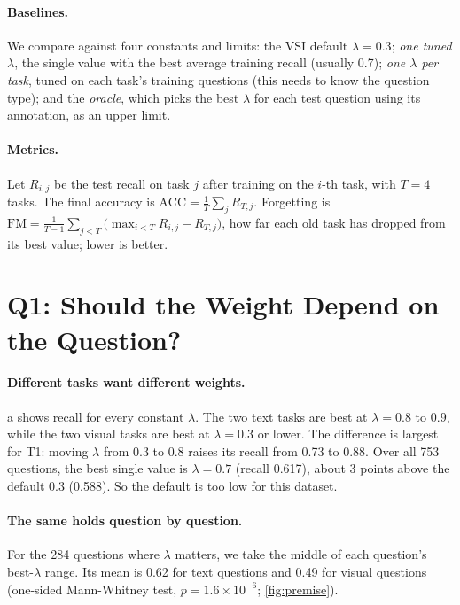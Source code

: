 \documentclass[10pt,twocolumn,letterpaper]{article}
\newcommand{\lam}{\lambda}
\begin{document}
\paragraph{Baselines.}
We compare against four constants and limits:
the VSI default $\lam=0.3$;
\emph{one tuned $\lam$}, the single value with the best average training recall (usually 0.7);
\emph{one $\lam$ per task}, tuned on each task's training questions (this needs to know the question type);
and the \emph{oracle}, which picks the best $\lam$ for each test question using its annotation, as an upper limit.

\paragraph{Metrics.}
Let $R_{i,j}$ be the test recall on task $j$ after training on the $i$-th task, with $T=4$ tasks.
The final accuracy is $\text{ACC}=\frac{1}{T}\sum_j R_{T,j}$.
Forgetting is $\text{FM}=\frac{1}{T-1}\sum_{j<T}\big(\max_{i<T} R_{i,j}-R_{T,j}\big)$, \ie how far each old task has dropped from its best value; lower is better.

\section{Q1: Should the Weight Depend on the Question?}
\label{sec:q1}







\paragraph{Different tasks want different weights.}
a shows recall for every constant $\lam$.
The two text tasks are best at $\lam=0.8$ to $0.9$, while the two visual tasks are best at $\lam=0.3$ or lower.
The difference is largest for T1: moving $\lam$ from 0.3 to 0.8 raises its recall from 0.73 to 0.88.
Over all 753 questions, the best single value is $\lam=0.7$ (recall 0.617), about 3 points above the default 0.3 (0.588).
So the default is too low for this dataset.

\paragraph{The same holds question by question.}
For the 284 questions where $\lam$ matters, we take the middle of each question's best-$\lam$ range.
Its mean is 0.62 for text questions and 0.49 for visual questions (one-sided Mann-Whitney test, $p=1.6\times10^{-6}$; \cref{fig:premise}).
\end{document}
